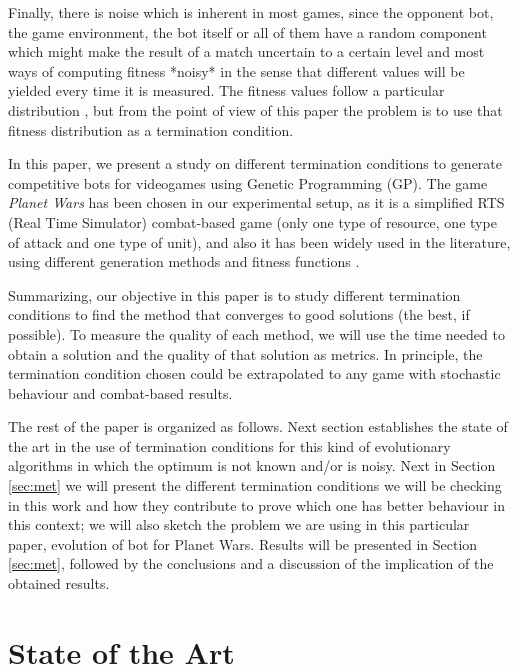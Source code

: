 \documentclass[runningheads,a4paper]{llncs}
\begin{document}
Finally, there is noise which is inherent in most games, since the
opponent bot, the game environment, the bot itself or all of them have
a random component which might make the result of a match uncertain to
a certain level and most ways of computing fitness *noisy* in the
sense that different values will be yielded every time it is
measured. The fitness values follow a particular distribution
\cite{merelo14:noisy}, but from the point of view of this paper the
problem is to use that fitness distribution as a termination
condition. 


In this paper, we present a study on different termination conditions to 
generate competitive bots for videogames using Genetic Programming (GP). The game \textit{Planet Wars} has been chosen in 
our experimental setup, as it is a simplified RTS (Real Time Simulator) combat-based
game (only one type of resource, one type of attack and one type
of unit), and also it has been widely used in the literature, using different generation methods and fitness functions 
\cite{DBLP:journals/jcst/MoraFGGF12,DBLP:conf/cec/Fernandez-AresMGGF11,DBLP:journals/nc/Lara-CabreraCL14,NogueiraCoevolutionary14}. 

Summarizing, our objective in this paper is to study different 
termination conditions to find the method that converges to good 
solutions (the best, if possible). To measure the quality of each 
method, we will use the time needed to obtain a solution and the
quality of that solution as metrics. In principle, the termination
condition chosen could be extrapolated to any game with
stochastic behaviour and combat-based results.

The rest of the paper is organized as follows. Next section
establishes the state of the art in the use of termination conditions
for this kind of evolutionary algorithms in which the optimum is not
known and/or is noisy. Next in Section \ref{sec:met} we will present the different termination
conditions we will be checking in this work and how they contribute to
prove which one has better behaviour in this context; we will also
sketch the problem we are using in this particular paper, evolution of
bot for Planet Wars. Results will be presented in Section
\ref{sec:met}, followed by the conclusions and a discussion of the
implication of the obtained results.

\section{State of the Art}
\end{document}
